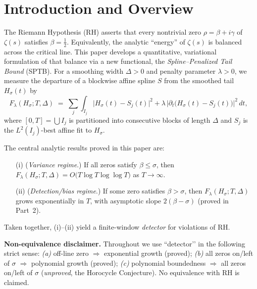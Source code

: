 

\section{Introduction and Overview}

The Riemann Hypothesis (RH) asserts that every nontrivial zero 
$\rho=\beta+i\gamma$ of $\zeta(s)$ satisfies $\beta=\tfrac12$.
Equivalently, the analytic ``energy'' of $\zeta(s)$ is balanced across the
critical line.  This paper develops a quantitative, variational formulation
of that balance via a new functional, the
\emph{Spline–Penalized Tail Bound} (SPTB).  For a smoothing width
$\Delta>0$ and penalty parameter $\lambda>0$, we measure the departure of a
blockwise affine spline $S$ from the smoothed tail $H_\sigma(t)$ by
\begin{equation}
F_\lambda(H_\sigma;T,\Delta)
  \;=\; \sum_{j}\!\int_{I_j}
       \bigl|H_\sigma(t)-S_j(t)\bigr|^2
       + \lambda\,\bigl|\partial_t\bigl(H_\sigma(t)-S_j(t)\bigr)\bigr|^2\,dt,
\label{eq:SPTB}
\tag{1.1}
\end{equation}
where $[0,T]=\bigcup I_j$ is partitioned into consecutive blocks of length $\Delta$ and
$S_j$ is the $L^2(I_j)$-best affine fit to $H_\sigma$.

The central analytic results proved in this paper are:
\begin{itemize}
\item[(i)] (\emph{Variance regime}.) If all zeros satisfy $\beta\le\sigma$, then
$F_\lambda(H_\sigma;T,\Delta)=O\!\bigl(T\log T\log\log T\bigr)$ as $T\to\infty$.
\item[(ii)] (\emph{Detection/bias regime}.) If some zero satisfies $\beta>\sigma$,
then $F_\lambda(H_\sigma;T,\Delta)$ grows exponentially in $T$, with asymptotic
slope $2(\beta-\sigma)$ (proved in Part~2).
\end{itemize}
Taken together, (i)–(ii) yield a finite-window \emph{detector} for violations of RH.

\medskip
\noindent\textbf{Non-equivalence disclaimer.}
Throughout we use “detector’’ in the following strict sense:
\emph{(a)} off-line zero $\Rightarrow$ exponential growth (proved);
\emph{(b)} all zeros on/left of $\sigma$ $\Rightarrow$ polynomial growth (proved);
\emph{(c)} polynomial boundedness $\Rightarrow$ all zeros on/left of $\sigma$
(\emph{unproved}, the Horocycle Conjecture).  No equivalence with RH is claimed.

